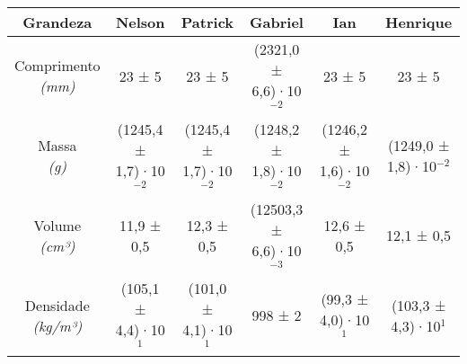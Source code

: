 \documentclass{article}
\begin{document}
\begin{table}[h!]
\centering
\begin{tabular}{c c c c c c }
\toprule
Grandeza & Nelson & Patrick & Gabriel & Ian & Henrique\\
\midrule
\shortstack{Comprimento\\\textit{(mm)}} & 23 ± 5 & 23 ± 5 & (2321,0 ± 6,6)·10$^{-2}$ & 23 ± 5 & 23 ± 5\\[4pt]
\shortstack{Massa\\\textit{(g)}} & (1245,4 ± 1,7)·10$^{-2}$ & (1245,4 ± 1,7)·10$^{-2}$ & (1248,2 ± 1,8)·10$^{-2}$ & (1246,2 ± 1,6)·10$^{-2}$ & (1249,0 ± 1,8)·10$^{-2}$\\[4pt]
\shortstack{Volume\\\textit{(cm³)}} & 11,9 ± 0,5 & 12,3 ± 0,5 & (12503,3 ± 6,6)·10$^{-3}$ & 12,6 ± 0,5 & 12,1 ± 0,5\\[4pt]
\shortstack{Densidade\\\textit{(kg/m³)}} & (105,1 ± 4,4)·10$^{1}$ & (101,0 ± 4,1)·10$^{1}$ & 998 ± 2 & (99,3 ± 4,0)·10$^{1}$ & (103,3 ± 4,3)·10$^{1}$\\[4pt]
\bottomrule
\end{tabular}
\end{table}
\end{document}

